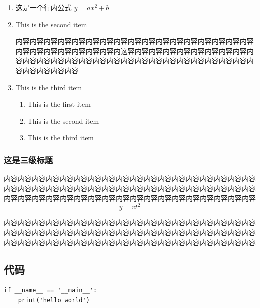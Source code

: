 \documentclass{bjfu}
\begin{document}
\begin{enumerate}[labelsep = .5em, leftmargin = 0pt, itemindent = 3em]
    \item 这是一个行内公式 $y = ax^2+b$
    
    \item This is the second item %
    
    \setlength{\parindent}{2em}内容内容内容内容内容内容内容内容内容内容内容内容内容内容内容内容内容内容内容内容内容内容内容内容内这容内容内容内容内容内容内容内容内容内容内容内容内容内容内容内容内容内容内容内容内容内容内容内容内容内容内容内容内容内容内容
    \item This is the third item 
    
    \begin{enumerate}[itemindent=2em]
        \item This is the first item
        \item This is the second item
        \item This is the third item
    \end{enumerate}
\end{enumerate}




\subsubsection{这是三级标题}

内容内容内容内容内容内容内容内容内容内容内容内容内容内容内容内容内容内容内容内容内容内容内容内容内容内容内容内容内容内容内容内容内容内容内容内容内容内容内容内容内容内容内容内容内容内容内容内容内容内容内容内容内容内容
\begin{equation}
    y=vt^2
\end{equation}




内容内容内容内容内容内容内容内容内容内容内容内容内容内容内容内容内容内容内容内容内容内容内容内容内容内容内容内容内容内容内容内容内容内容内容内容内容内容内容内容内容内容内容内容内容内容内容内容内容内容内容内容内容内容

\subsection{代码}

\begin{verbatim}
if __name__ == '__main__':
    print('hello world')
\end{verbatim}
\end{document}
